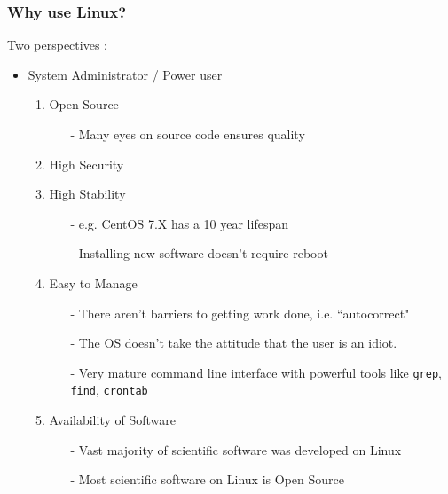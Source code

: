 \documentclass{beamer}
\newcommand{\code}[1]{\colorbox{codegray}{\texttt{#1}}}
\begin{document}
\begin{frame}
\frametitle{Why use Linux?}
Two perspectives : 
\begin{itemize}
    \item System Administrator / Power user
    \pause
    \begin{enumerate}
        \item Open Source 
        \begin{itemize}
            \pause
            \item[-] Many eyes on source code ensures quality
        \end{itemize}
        \pause
        \item High Security 
        \pause
        \item High Stability
        \begin{itemize}
            \pause
            \item[-] e.g. CentOS 7.X has a 10 year lifespan
            \pause
            \item[-] Installing new software doesn't require reboot
        \end{itemize}
        \pause
        \item Easy to Manage
        \begin{itemize}
            \pause
            \item[-] There aren't barriers to getting work done, i.e. ``autocorrect"
            \pause
            \item[-] The OS doesn't take the attitude that the user is an idiot.
            \pause
            \item[-] Very mature command line interface with powerful tools like \code{grep}, \code{find}, \code{crontab}
        \end{itemize}
        \pause
        \item Availability of Software
        \pause
        \begin{itemize}
            \item[-] Vast majority of scientific software was developed on Linux 
            \pause
            \item[-] Most scientific software on Linux is Open Source 
        \end{itemize}
    \end{enumerate}
\end{itemize}
\end{frame}
\end{document}
